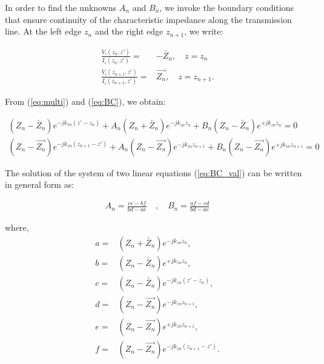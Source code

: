 \documentclass[11pt]{article}
\renewcommand{\^}{\hat}  %
\begin{document}
In order to find the unknowns $A_n$ and $B_n$, we invoke the boundary conditions that ensure continuity of the characteristic impedance along the transmission line. At the left edge $z_n$ and the right edge $z_{n+1}$, we write:

\begin{subequations}
  \begin{align}
    \frac{V_i(z_n,z')}{I_i(z_n,z')} ={}& -\overleftarrow{Z_n} , \quad z = z_n
    \label{eq:BC_left}\\
    \frac{V_i(z_{n+1},z')}{I_i(z_{n+1},z')} ={}& \overrightarrow{Z_n} ,\quad  z = z_{n+1}.
    \label{eq:BC_right}
  \end{align}
  \label{eq:BC}
\end{subequations}

From (\ref{eq:multi}) and (\ref{eq:BC}), we obtain:

\begin{subequations}
  \begin{align}
    \left( Z_n - \overleftarrow{Z_n} \right) e^{-j k_{zn} (z' - z_n) } +  A_n\left( Z_n + \overleftarrow{Z_n} \right) e^{-j k_{zn} z_n } +
    B_n\left( Z_n - \overleftarrow{Z_n} \right) e^{+j k_{zn} z_n } = 0
    \label{eq:BC_at_left}\\
    \left( Z_n - \overrightarrow{Z_n} \right) e^{-j k_{zn} (z_{n+1} - z') } +  A_n\left( Z_n - \overrightarrow{Z_n} \right) e^{-j k_{zn} z_{n+1} } +
    B_n \left( Z_n - \overrightarrow{Z_n} \right) e^{+j k_{zn} z_{n+1} } = 0
    \label{eq:BC_at_right}
  \end{align}
  \label{eq:BC_val}
\end{subequations}

The solution of the system of two linear equations (\ref{eq:BC_val}) can be written in general form as:

\begin{align}
  A_n = \frac{ c e - b f }{bd - a e}\quad , \quad
  B_n = \frac{ a f - c d }{bd - a e}
  \label{eq:gen_sol}
\end{align}

where,
\begin{subequations}
  \begin{align}
    a ={}& \left( Z_n + \overleftarrow{Z_n} \right) e^{-j k_{zn} z_n },\\
    b ={}& \left( Z_n - \overleftarrow{Z_n} \right) e^{+j k_{zn} z_n },\\
    c ={}& \left( Z_n - \overleftarrow{Z_n} \right) e^{-j k_{zn} (z' - z_n)},\\
    d ={}& \left( Z_n - \overrightarrow{Z_n} \right) e^{-j k_{zn} z_{n+1} },\\
    e ={}& \left( Z_n - \overrightarrow{Z_n} \right) e^{+j k_{zn} z_{n+1} },\\
    f ={}& \left( Z_n - \overrightarrow{Z_n} \right) e^{-j k_{zn} (z_{n+1} - z') }.
    \label{eq:terms}
  \end{align}
\end{subequations}
\end{document}
